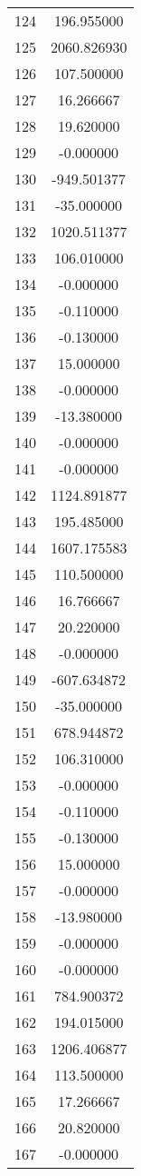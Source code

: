 \documentclass[12pt]{article}
\begin{document}
\begin{longtable}{@{}cc@{}}
124 & 196.955000 \\
125 & 2060.826930 \\
126 & 107.500000 \\
127 & 16.266667 \\
128 & 19.620000 \\
129 & -0.000000 \\
130 & -949.501377 \\
131 & -35.000000 \\
132 & 1020.511377 \\
133 & 106.010000 \\
134 & -0.000000 \\
135 & -0.110000 \\
136 & -0.130000 \\
137 & 15.000000 \\
138 & -0.000000 \\
139 & -13.380000 \\
140 & -0.000000 \\
141 & -0.000000 \\
142 & 1124.891877 \\
143 & 195.485000 \\
144 & 1607.175583 \\
145 & 110.500000 \\
146 & 16.766667 \\
147 & 20.220000 \\
148 & -0.000000 \\
149 & -607.634872 \\
150 & -35.000000 \\
151 & 678.944872 \\
152 & 106.310000 \\
153 & -0.000000 \\
154 & -0.110000 \\
155 & -0.130000 \\
156 & 15.000000 \\
157 & -0.000000 \\
158 & -13.980000 \\
159 & -0.000000 \\
160 & -0.000000 \\
161 & 784.900372 \\
162 & 194.015000 \\
163 & 1206.406877 \\
164 & 113.500000 \\
165 & 17.266667 \\
166 & 20.820000 \\
167 & -0.000000 \\

\end{longtable}
\end{document}
